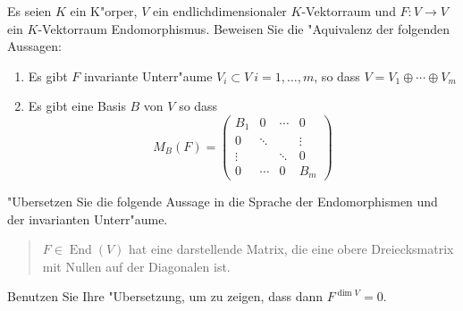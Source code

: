 \documentclass[a4,11pt]{article}
\DeclareMathOperator{\End}{End}
\begin{document}
\begin{aufgabe}
Es seien $K$ ein K"orper, $V$ ein endlichdimensionaler $K$-Vektorraum und $F : V \rightarrow V$ ein $K$-Vektorraum Endomorphismus. Beweisen Sie die "Aquivalenz der folgenden Aussagen:


\begin{enumerate}
\item Es gibt $F$ invariante Unterr"aume $V_i \subset V \ i= 1,\dots , m$, so dass $V = V_1 \oplus \cdots \oplus V_m$
\item Es gibt eine Basis $B$ von $V$ so dass 
\[
M_B(F) = \begin{pmatrix}B_1 & 0 & \cdots& 0\\
0& \ddots & & \vdots \\
\vdots & & \ddots& 0 \\
0 & \cdots & 0 & B_m
\end{pmatrix}
\]
\end{enumerate}
\end{aufgabe}

\begin{aufgabe}
  "Ubersetzen Sie die folgende Aussage in die Sprache der
  Endomorphismen und der invarianten Unterr"aume.
  \begin{quotation}
    $F \in \End(V)$ hat eine darstellende Matrix, die eine obere
    Dreiecksmatrix mit Nullen auf der Diagonalen ist.
  \end{quotation}

  Benutzen Sie Ihre "Ubersetzung, um zu zeigen, dass dann $F^{\dim V}
  = 0$.
\end{aufgabe}
\end{document}
